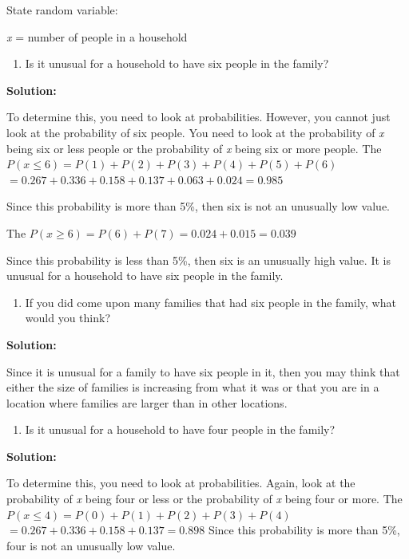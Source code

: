 \documentclass[
]{book}
\providecommand{\tightlist}{%
  \setlength{\itemsep}{0pt}\setlength{\parskip}{0pt}}
\begin{document}
State random variable:

\emph{x} = number of people in a household

\begin{enumerate}
\def\labelenumi{\alph{enumi}.}
\tightlist
\item
  Is it unusual for a household to have six people in the family?
\end{enumerate}

\textbf{Solution:}

To determine this, you need to look at probabilities. However, you cannot just look at the probability of six people. You need to look at the probability of \emph{x} being six or less people or the probability of \emph{x} being six or more people. The \(P(x \le 6)=P(1)+P(2)+P(3)+P(4)+P(5)+P(6)\)
\(=0.267+0.336+0.158+0.137+0.063+0.024=0.985\)

Since this probability is more than 5\%, then six is not an unusually low value.

The \(P(x \ge 6)=P(6)+P(7)=0.024+0.015=0.039\)

Since this probability is less than 5\%, then six is an unusually high value. It is unusual for a household to have six people in the family.

\begin{enumerate}
\def\labelenumi{\alph{enumi}.}
\setcounter{enumi}{1}
\tightlist
\item
  If you did come upon many families that had six people in the family, what would you think?
\end{enumerate}

\textbf{Solution:}

Since it is unusual for a family to have six people in it, then you may think that either the size of families is increasing from what it was or that you are in a location where families are larger than in other locations.

\begin{enumerate}
\def\labelenumi{\alph{enumi}.}
\setcounter{enumi}{2}
\tightlist
\item
  Is it unusual for a household to have four people in the family?
\end{enumerate}

\textbf{Solution:}

To determine this, you need to look at probabilities. Again, look at the probability of \emph{x} being four or less or the probability of \emph{x} being four or more. The \(P(x \le 4)=P(0)+P(1)+P(2)+P(3)+P(4)\)
\(=0.267+0.336+0.158+0.137=0.898\)
Since this probability is more than 5\%, four is not an unusually low value.
\end{document}
